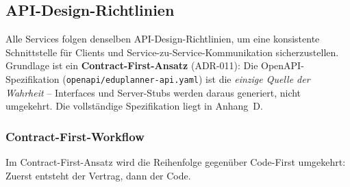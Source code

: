 \subsection{API-Design-Richtlinien}

Alle Services folgen denselben API-Design-Richtlinien, um eine konsistente
Schnittstelle für Clients und Service-zu-Service-Kommunikation sicherzustellen.
Grundlage ist ein \textbf{Contract-First-Ansatz} (ADR-011): Die
OpenAPI-Spezifikation (\texttt{openapi/}\allowbreak \texttt{eduplanner-}\allowbreak \texttt{api.yaml}) ist die
\emph{einzige Quelle der Wahrheit} -- Interfaces und Server-Stubs werden
daraus generiert, nicht umgekehrt.
Die vollständige Spezifikation liegt in Anhang~D.

\subsubsection{Contract-First-Workflow}

Im Contract-First-Ansatz wird die Reihenfolge gegenüber Code-First
umgekehrt: Zuerst entsteht der Vertrag, dann der Code.

